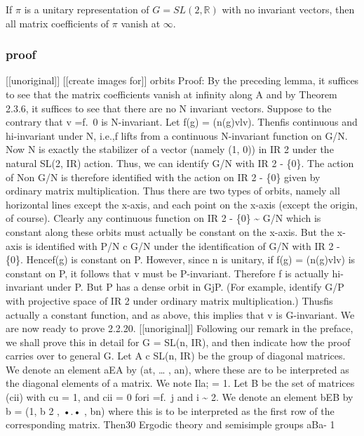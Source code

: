 \documentclass[
]{article}
\begin{document}
If \(\pi\) is a unitary representation of \(G = SL(2, \mathbb{R})\) with
no invariant vectors, then all matrix coefficients of \(\pi\) vanish at
\(\infty\).

\hypertarget{proof-2}{%
\subsubsection{proof}\label{proof-2}}

{[}{[}unoriginal{]}{]} {[}{[}create images for{]}{]} orbits Proof: By
the preceding lemma, it suffices to see that the matrix coefficients
vanish at infinity along A and by Theorem 2.3.6, it suffices to see that
there are no N invariant vectors. Suppose to the contrary that v =f.~0
is N-invariant. Let f(g) = (n(g)vlv). Thenfis continuous and
hi-invariant under N, i.e.,f lifts from a continuous N-invariant
function on G/N. Now N is exactly the stabilizer of a vector (namely (1,
0)) in IR 2 under the natural SL(2, IR) action. Thus, we can identify
G/N with IR 2 - \{0\}. The action of Non G/N is therefore identified
with the action on IR 2 - \{0\} given by ordinary matrix multiplication.
Thus there are two types of orbits, namely all horizontal lines except
the x-axis, and each point on the x-axis (except the origin, of course).
Clearly any continuous function on IR 2 - \{0\} \textasciitilde{} G/N
which is constant along these orbits must actually be constant on the
x-axis. But the x-axis is identified with P/N c G/N under the
identification of G/N with IR 2 - \{0\}. Hencef(g) is constant on P.
However, since n is unitary, if f(g) = (n(g)vlv) is constant on P, it
follows that v must be P-invariant. Therefore f is actually hi-invariant
under P. But P has a dense orbit in GjP. (For example, identify G/P with
projective space of IR 2 under ordinary matrix multiplication.) Thusfis
actually a constant function, and as above, this implies that v is
G-invariant. We are now ready to prove 2.2.20.
{[}{[}unoriginal{]}{]} Following our remark in the preface, we shall
prove this in detail for G = SL(n, IR), and then indicate how the proof
carries over to general G. Let A c SL(n, IR) be the group of diagonal
matrices. We denote an element aEA by (at, \ldots{} , an), where these
are to be interpreted as the diagonal elements of a matrix. We note Ila;
= 1. Let B be the set of matrices (cii) with cu = 1, and cii = 0 fori
=f.~j and i \textasciitilde{} 2. We denote an element bEB by b = (1, b 2
, •.• , bn) where this is to be interpreted as the first row of the
corresponding matrix. Then30 Ergodic theory and semisimple groups aBa- 1
\end{document}
